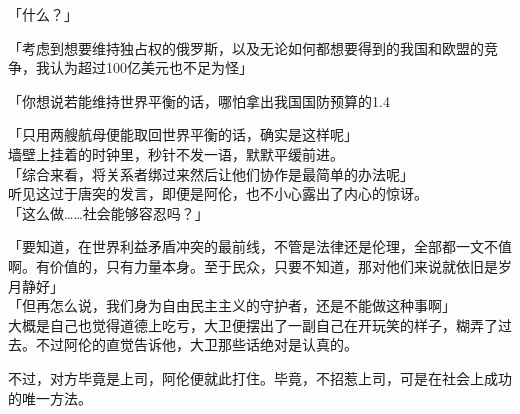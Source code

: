 「什么？」

「考虑到想要维持独占权的俄罗斯，以及无论如何都想要得到的我国和欧盟的竞争，我认为超过100亿美元也不足为怪」

「你想说若能维持世界平衡的话，哪怕拿出我国国防预算的1.4%

「只用两艘航母便能取回世界平衡的话，确实是这样呢」\\

墙壁上挂着的时钟里，秒针不发一语，默默平缓前进。\\

「综合来看，将关系者绑过来然后让他们协作是最简单的办法呢」\\

听见这过于唐突的发言，即便是阿伦，也不小心露出了内心的惊讶。\\

「这么做……社会能够容忍吗？」

「要知道，在世界利益矛盾冲突的最前线，不管是法律还是伦理，全部都一文不值啊。有价值的，只有力量本身。至于民众，只要不知道，那对他们来说就依旧是岁月静好」\\

「但再怎么说，我们身为自由民主主义的守护者，还是不能做这种事啊」\\

大概是自己也觉得道德上吃亏，大卫便摆出了一副自己在开玩笑的样子，糊弄了过去。不过阿伦的直觉告诉他，大卫那些话绝对是认真的。

不过，对方毕竟是上司，阿伦便就此打住。毕竟，不招惹上司，可是在社会上成功的唯一方法。\\

